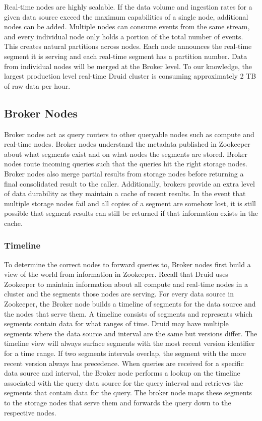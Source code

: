 \documentclass{vldb}
\begin{document}
Real-time nodes are highly scalable. If the data volume and ingestion rates
for a given data source exceed the maximum capabilities of a single node, additional nodes can be added.
Multiple nodes can consume events from the same stream, and every individual node only holds a portion of the total number of events.
This creates natural partitions across nodes. Each node announces the real-time segment it is serving and each real-time segment has a partition number.
Data from individual nodes will be merged at the Broker level.
To our knowledge, the largest production level real-time Druid cluster is consuming approximately
2 TB of raw data per hour.

\subsection{Broker Nodes}
Broker nodes act as query routers to other queryable nodes such as
compute and real-time nodes. Broker nodes understand the metadata
published in Zookeeper about what segments exist and on what nodes the
segments are stored. Broker nodes route incoming queries such that the queries hit
the right storage nodes. Broker nodes also merge partial results from
storage nodes before returning a final consolidated result to the
caller.  Additionally, brokers provide an extra level of data
durability as they maintain a cache of recent results. In the event
that multiple storage nodes fail and all copies of a segment are
somehow lost, it is still possible that segment results can still be
returned if that information exists in the cache.

\subsubsection{Timeline}
To determine the correct nodes to forward queries to, Broker nodes
first build a view of the world from information in Zookeeper. Recall
that Druid uses Zookeeper to maintain information about all compute
and real-time nodes in a cluster and the segments those nodes are
serving. For every data source in Zookeeper, the Broker node builds a
timeline of segments for the data source and the nodes that serve them. A timeline
consists of segments and represents which segments contain data for
what ranges of time. Druid may have multiple segments where the data
source and interval are the same but versions differ. The timeline
view will always surface segments with the most recent version
identifier for a time range. If two segments intervals overlap, the segment with the more recent
version always has precedence. When queries are received for a specific
data source and interval, the Broker node performs a lookup on the
timeline associated with the query data source for the query interval
and retrieves the segments that contain data for the query. The broker
node maps these segments to the storage nodes that serve them and
forwards the query down to the respective nodes.
\end{document}
